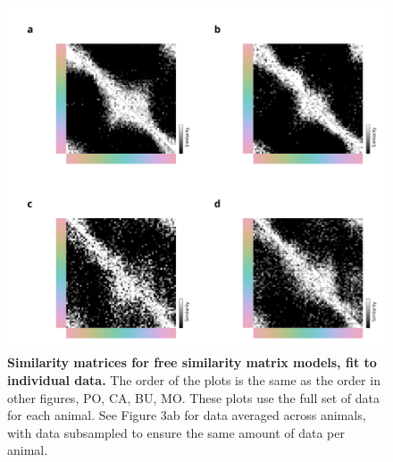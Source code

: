 \documentclass[9pt,biorxiv,lineno,onehalfspacing]{lapreprint}
\begin{document}
\begin{figure}
    \centering
    \begin{fullwidth}
    \includegraphics[width=\textwidth+4cm]{Outputs/Paper/Figures/flat/SI5_IndTCCv.jpg}
    \caption{\textbf{Similarity matrices for free similarity matrix models, fit to individual data.}
    The order of the plots is the same as the order in other figures, PO, CA, BU, MO. 
    These plots use the full set of data for each animal.
    See Figure 3ab for data averaged across animals, with data subsampled to ensure the same amount of data per animal.
    } 
    \label{fig:IndiTCC}
    \end{fullwidth}
\end{figure}
\end{document}
